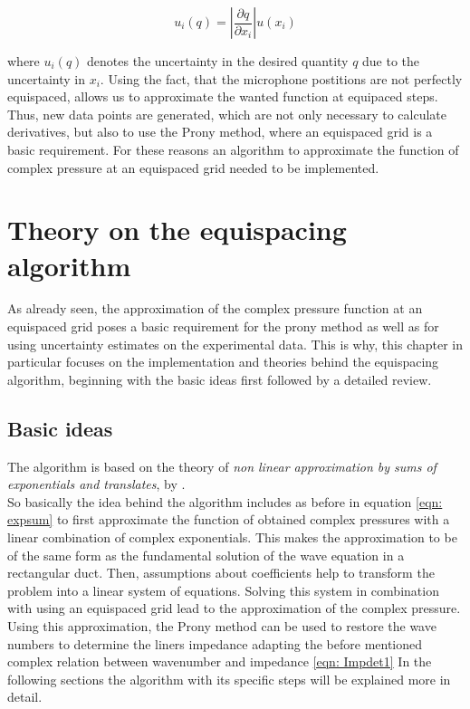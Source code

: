 \documentclass[11pt]{report} %
\begin{document}
\begin{equation}
u_{i}(q)= \left\vert \frac{\partial q}{\partial x_{i}} \right\vert u( x_{i})
\end{equation}

where $u_{i}(q)$ denotes the uncertainty in the desired quantity $q$ due to the uncertainty in $x_{i}$.
Using the fact, that the microphone postitions are not perfectly equispaced, allows us to approximate the wanted function at equipaced steps.
Thus, new data points are generated, which are not only necessary to calculate derivatives, but also to use the Prony method, where an equispaced grid is a basic requirement.
For these reasons an algorithm to approximate the function of complex pressure at an equispaced grid needed to be implemented. 
  
\chapter{Theory on the equispacing algorithm} 
As already seen, the approximation of the complex pressure function at an equispaced grid poses a basic requirement for the prony method as well as for using uncertainty estimates on the experimental data.
This is why, this chapter in particular focuses on the implementation and theories behind the equispacing algorithm, beginning with the basic ideas first followed by a detailed review. 

\section{Basic ideas}
The algorithm is based on the theory of \textit{non linear approximation by sums of exponentials and translates}, by \cite{Peter2011}.\\
So basically the idea behind the algorithm includes as before in equation \eqref{eqn: expsum} to first approximate the function of obtained complex pressures with a linear combination of complex exponentials.
This makes the approximation to be of the same form as the fundamental solution of the wave equation in a rectangular duct.
Then, assumptions about coefficients help to transform the problem into a linear system of equations. Solving this system in combination with using an equispaced grid lead to the approximation of the complex pressure. 
Using this approximation, the Prony method can be used to restore the wave numbers to determine the liners impedance adapting the before mentioned complex relation between wavenumber and impedance \ref{eqn: Impdet1} 
In the following sections the algorithm with its specific steps will be explained more in detail. 
\end{document}
